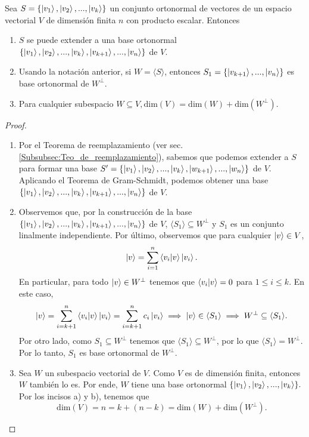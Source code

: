 \documentclass[12pt,dvipsnames]{article}
\newenvironment{teorema}[2][Teorema]{\begin{trivlist}
\item[\hskip \labelsep {\bfseries #1}\hskip \labelsep {\bfseries #2.}]}{\end{trivlist}}
\begin{document}
\begin{teorema} {13.1.2}
    Sea $S=\{\ket{v_1},\ket{v_2},...,\ket{v_k}\}$ un conjunto ortonormal de vectores de un espacio vectorial $V$ de dimensión finita $n$ con producto escalar. Entonces
    \begin{enumerate}[label=\alph*)]  
    \item $S$ se puede extender a una base ortonormal $\{\ket{v_1},\ket{v_2},...,\ket{v_k},\ket{v_{k+1}},...,\ket{v_n}\}$ de $V$.
    \item Usando la notación anterior, si $W=\langle S \rangle$, entonces $S_1=\{\ket{v_{k+1}},...,\ket{v_n}\}$ es base ortonormal de $W^{\perp}$. 
    \item Para cualquier subespacio $W \subseteq V, \text{dim}(V) = \text{dim}(W) + \text{dim}(W^{\perp}).$
    \end{enumerate}
    \begin{proof}
        \begin{enumerate}[label=\alph*)]
            \item Por el Teorema de reemplazamiento (ver sec. \ref{Subsubsec:Teo_de_reemplazamiento}), sabemos que podemos extender a $S$ para formar una base $S'=\{\ket{v_1},\ket{v_2},...,\ket{v_k},\ket{w_{k+1}},...,\ket{w_n}\}$ de $V$. Aplicando el Teorema de Gram-Schmidt, podemos obtener una base $\{\ket{v_1},\ket{v_2},...,\ket{v_k},\ket{v_{k+1}},...,\ket{v_n}\}$ de $V$.
            \item Observemos que, por la construcción de la base $\{\ket{v_1},\ket{v_2},...,\ket{v_k},\ket{v_{k+1}},...,\ket{v_n}\}$ de $V$, $\langle S_1 \rangle \subseteq W^{\perp}$ y $S_1$ es un conjunto linalmente independiente. Por último, observemos que para cualquier $\ket{v}\in V$, $$\ket{v}=\sum_{i=1}^n \braket{v_i|v}\ket{v_i}.$$ \noindent En particular, para todo $\ket{v}\in W^\perp$ tenemos que $\braket{v_i|v}=0$ para $1\le i\le k$. En este caso, \[
                \ket{v}=\sum_{i=k+1}^n\braket{v_i|v}\ket{v_i}=\sum_{i=k+1}^n c_i\ket{v_i}\implies \ket{v}\in \langle S_1 \rangle \implies W^\perp \subseteq \langle S_1 \rangle .\] \noindent Por otro lado, como $S_1 \subseteq W^\perp$ tenemos que $\langle S_1 \rangle \subseteq W^\perp$, por lo que $\langle S_1 \rangle = W^\perp.$ Por lo tanto, $S_1$ es base ortonormal de $W^\perp$. 
            \item Sea $W$ un subespacio vectorial de $V$. Como $V$ es de dimensión finita, entonces $W$ también lo es. Por ende, $W$ tiene una base ortonormal $\{\ket{v_1},\ket{v_2},...,\ket{v_k}\}.$ Por los incisos a) y b), tenemos que \[
                    \text{dim}(V) = n = k + (n-k) = \text{dim}(W) + \text{dim}(W^\perp).\]  
        \end{enumerate}
    \end{proof}
\end{teorema}
\end{document}
